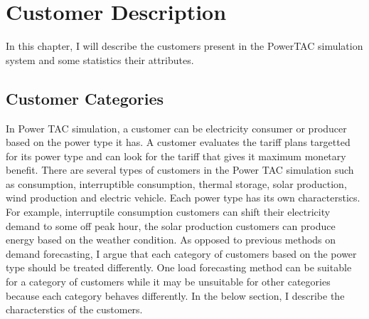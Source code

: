 
\chapter{Customer Description} 

In this chapter, I will describe the customers present in the PowerTAC simulation system and some statistics their attributes.

\section{Customer Categories}


In Power TAC simulation, a customer can be electricity consumer or producer based on the power type it has. A customer evaluates the tariff plans targetted for its power type and can look for the tariff that gives it maximum monetary benefit. There are several types of customers in the Power TAC simulation such as consumption, interruptible consumption, thermal storage, solar production, wind production and electric vehicle. Each power type has its own characterstics. For example, interruptile consumption customers can shift their electricity demand to some off peak hour, the solar production customers can produce energy based on the weather condition. As opposed to previous methods on demand forecasting, I argue that each category of customers based on the power type should be treated differently. One load forecasting method can be suitable for a category of customers while it may be unsuitable for other categories because each category behaves differently. In the below section, I describe the characterstics of the customers.

